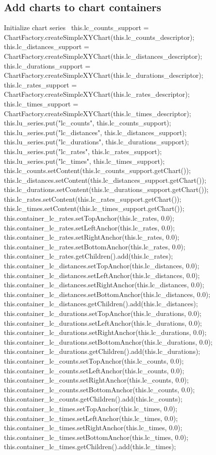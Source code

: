 \subsection{Add charts to chart containers}
\nwenddocs{}\endmoddef{}
\LA{}Initialize chart series~{\nwtagstyle{}}\RA{}
this.lc_counts_support = ChartFactory.createSimpleXYChart(this.lc_counts_descriptor);
this.lc_distances_support = ChartFactory.createSimpleXYChart(this.lc_distances_descriptor);
this.lc_durations_support = ChartFactory.createSimpleXYChart(this.lc_durations_descriptor);
this.lc_rates_support = ChartFactory.createSimpleXYChart(this.lc_rates_descriptor);
this.lc_times_support = ChartFactory.createSimpleXYChart(this.lc_times_descriptor);
this.lu_series.put("lc_counts", this.lc_counts_support);
this.lu_series.put("lc_distances", this.lc_distances_support);
this.lu_series.put("lc_durations", this.lc_durations_support);
this.lu_series.put("lc_rates", this.lc_rates_support);
this.lu_series.put("lc_times", this.lc_times_support);
this.lc_counts.setContent(this.lc_counts_support.getChart());
this.lc_distances.setContent(this.lc_distances_support.getChart());
this.lc_durations.setContent(this.lc_durations_support.getChart());
this.lc_rates.setContent(this.lc_rates_support.getChart());
this.lc_times.setContent(this.lc_times_support.getChart());
this.container_lc_rates.setTopAnchor(this.lc_rates, 0.0);
this.container_lc_rates.setLeftAnchor(this.lc_rates, 0.0);
this.container_lc_rates.setRightAnchor(this.lc_rates, 0.0);
this.container_lc_rates.setBottomAnchor(this.lc_rates, 0.0);
this.container_lc_rates.getChildren().add(this.lc_rates);
this.container_lc_distances.setTopAnchor(this.lc_distances, 0.0);
this.container_lc_distances.setLeftAnchor(this.lc_distances, 0.0);
this.container_lc_distances.setRightAnchor(this.lc_distances, 0.0);
this.container_lc_distances.setBottomAnchor(this.lc_distances, 0.0);
this.container_lc_distances.getChildren().add(this.lc_distances);
this.container_lc_durations.setTopAnchor(this.lc_durations, 0.0);
this.container_lc_durations.setLeftAnchor(this.lc_durations, 0.0);
this.container_lc_durations.setRightAnchor(this.lc_durations, 0.0);
this.container_lc_durations.setBottomAnchor(this.lc_durations, 0.0);
this.container_lc_durations.getChildren().add(this.lc_durations);
this.container_lc_counts.setTopAnchor(this.lc_counts, 0.0);
this.container_lc_counts.setLeftAnchor(this.lc_counts, 0.0);
this.container_lc_counts.setRightAnchor(this.lc_counts, 0.0);
this.container_lc_counts.setBottomAnchor(this.lc_counts, 0.0);
this.container_lc_counts.getChildren().add(this.lc_counts);
this.container_lc_times.setTopAnchor(this.lc_times, 0.0);
this.container_lc_times.setLeftAnchor(this.lc_times, 0.0);
this.container_lc_times.setRightAnchor(this.lc_times, 0.0);
this.container_lc_times.setBottomAnchor(this.lc_times, 0.0);
this.container_lc_times.getChildren().add(this.lc_times);
\nwendcode{}\nwdocspar

